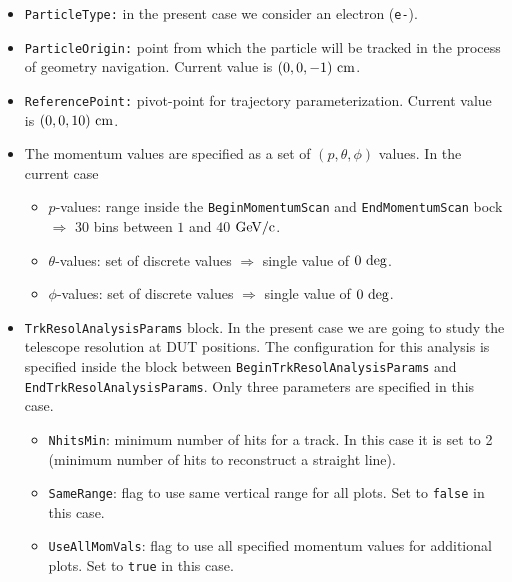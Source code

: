 \begin{itemize}
 \item  {\tt ParticleType:} in the present case we consider an electron ({\tt e-}).
 
 \item  {\tt ParticleOrigin:} point from which the particle will be tracked in the process of geometry navigation. Current value is $(0,0,-1)~{\rm cm}$.
 
 \item  {\tt ReferencePoint:} pivot-point for trajectory parameterization. Current value is $(0,0,10)~{\rm cm}$.
 
 \item  The momentum values are specified as a set of $(p,\theta,\phi)$ values. In the current case 
 
  \begin{itemize}
   \item  $p$-values: range inside the {\tt BeginMomentumScan} and {\tt EndMomentumScan} bock $\Rightarrow$ 30 bins between $1$ and $40$ ${\rm GeV/c}$.
   
   \item  $\theta$-values: set of discrete values $\Rightarrow$ single value of $0~{\rm deg}$.
   
   \item  $\phi$-values: set of discrete values $\Rightarrow$ single value of $0~{\rm deg}$.
  \end{itemize}
  
  \item {\tt TrkResolAnalysisParams} block. In the present case we are going to study the telescope resolution at DUT positions. The configuration for 
  this analysis is specified inside the block between {\tt BeginTrkResolAnalysisParams} and {\tt EndTrkResolAnalysisParams}. Only three parameters are 
  specified in this case.
  
  \begin{itemize}
   \item  {\tt NhitsMin}: minimum number of hits for a track. In this case it is set to 2 (minimum number of hits to reconstruct a straight line).
   
   \item  {\tt SameRange}: flag to use same vertical range for all plots. Set to {\tt false} in this case. 
   
   \item  {\tt UseAllMomVals}: flag to use all specified momentum values for additional plots. Set to {\tt true} in this case.
  \end{itemize}
  

\end{itemize}
